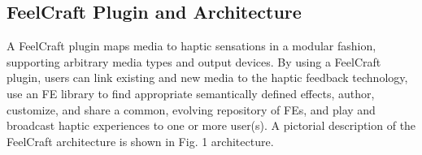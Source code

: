 

%	
%	
%	


\subsection{FeelCraft Plugin and Architecture}
A FeelCraft plugin maps media to haptic sensations in a modular fashion, supporting arbitrary media types and output devices.
By using a FeelCraft plugin, users can link existing and new media to the haptic feedback technology, use an FE library to find appropriate semantically defined effects, author, customize, and share a common, evolving repository of FEs, and play and broadcast haptic experiences to one or more user(s).
A pictorial description of the FeelCraft architecture is shown in Fig. 1 architecture.

